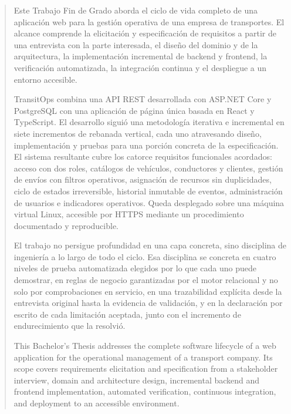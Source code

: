 \pagestyle{empty}
\begin{abstract}
  Este Trabajo Fin de Grado aborda el ciclo de vida completo de una aplicación web para la gestión operativa de una empresa de transportes. El alcance comprende la elicitación y especificación de requisitos a partir de una entrevista con la parte interesada, el diseño del dominio y de la arquitectura, la implementación incremental de backend y frontend, la verificación automatizada, la integración continua y el despliegue a un entorno accesible.

  TransitOps combina una API REST desarrollada con ASP.NET Core y PostgreSQL con una aplicación de página única basada en React y TypeScript. El desarrollo siguió una metodología iterativa e incremental en siete incrementos de rebanada vertical, cada uno atravesando diseño, implementación y pruebas para una porción concreta de la especificación. El sistema resultante cubre los catorce requisitos funcionales acordados: acceso con dos roles, catálogos de vehículos, conductores y clientes, gestión de envíos con filtros operativos, asignación de recursos sin duplicidades, ciclo de estados irreversible, historial inmutable de eventos, administración de usuarios e indicadores operativos. Queda desplegado sobre una máquina virtual Linux, accesible por HTTPS mediante un procedimiento documentado y reproducible.

  El trabajo no persigue profundidad en una capa concreta, sino disciplina de ingeniería a lo largo de todo el ciclo. Esa disciplina se concreta en cuatro niveles de prueba automatizada elegidos por lo que cada uno puede demostrar, en reglas de negocio garantizadas por el motor relacional y no solo por comprobaciones en servicio, en una trazabilidad explícita desde la entrevista original hasta la evidencia de validación, y en la declaración por escrito de cada limitación aceptada, junto con el incremento de endurecimiento que la resolvió.

  \vspace*{25pt}
  \begin{segundoresumo}
    This Bachelor's Thesis addresses the complete software lifecycle of a web application for the operational management of a transport company. Its scope covers requirements elicitation and specification from a stakeholder interview, domain and architecture design, incremental backend and frontend implementation, automated verification, continuous integration, and deployment to an accessible environment.


\end{segundoresumo}
\end{abstract}
